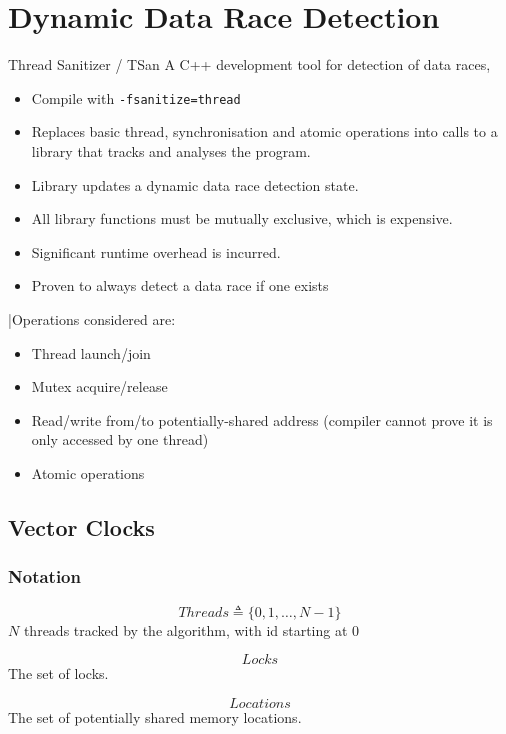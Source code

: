 \chapter{Dynamic Data Race Detection}

\begin{definitionbox}{Thread Sanitizer / TSan}
	A C++ development tool for detection of data races,
	\begin{itemize}
		\item Compile with \texttt{-fsanitize=thread}
		\item Replaces basic thread, synchronisation and atomic operations into calls to a library that tracks and analyses the program.
		\item Library updates a dynamic data race detection state.
		\item All library functions must be mutually exclusive, which is expensive.
		\item Significant runtime overhead is incurred.
		\item Proven to always detect a data race if one exists
	\end{itemize}
	|Operations considered are:
	\begin{itemize}
		\item Thread launch/join
		\item Mutex acquire/release
		\item Read/write from/to potentially-shared address (compiler cannot prove it is only accessed by one thread)
		\item Atomic operations
	\end{itemize}
\end{definitionbox}

\section{Vector Clocks}
\subsection{Notation}
\begin{minipage}{.33\textwidth}
	\[Threads \triangleq \{0,1,\dots, N-1\}\]
	\center
	$N$ threads tracked by the algorithm, with id starting at $0$
\end{minipage}
\begin{minipage}{.33\textwidth}
	\[Locks\]
	\center
	The set of locks.
\end{minipage}
\begin{minipage}{.33\textwidth}
	\[Locations\]
	\center
	The set of potentially shared memory locations.
\end{minipage}


